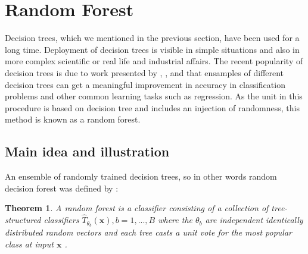 \section{Random Forest}
Decision trees, which we mentioned in the previous section, have been used for a long time. 
Deployment of decision trees is visible in simple situations and also in more complex scientific or real life and industrial affairs.
The recent popularity of decision trees is due to work presented by 
\cite{Breiman1996OUT-OF-BAG-E}, \cite{breiman2001random}, and \cite{breiman2004consistency} that ensamples of 
different decision trees can get a meaningful improvement in accuracy in classification problems and other 
common learning tasks such as regression. As the unit in this procedure is based on decision tree and includes an injection of
randomness, this method is known as a random forest. 

\subsection{Main idea and illustration}
An ensemble of randomly trained decision trees, so in other words random decision forest was defined by \cite{breiman2001random}:


\newtheorem{theorem}{Theorem}
\begin{theorem}
	A random forest is a classifier consisting of a collection of tree-structured classifiers ${\hat{T}_{\theta_{b}}(\textbf{x})}, b = 1,...,B$ where the $\theta_{b}$ are independent identically
	distributed random vectors and each tree casts a unit vote for the most popular class at input $\textbf{x}$ .
\end{theorem}

